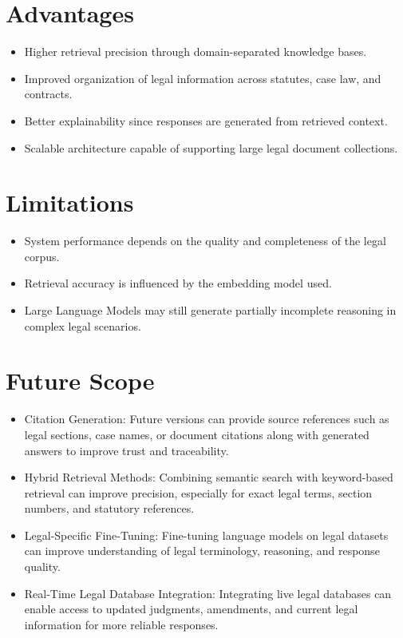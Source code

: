 \documentclass[12pt,a4paper]{article}
\begin{document}
\section{Advantages}

\begin{itemize}
\item Higher retrieval precision through domain-separated knowledge bases.
\item Improved organization of legal information across statutes, case law, and contracts.
\item Better explainability since responses are generated from retrieved context.
\item Scalable architecture capable of supporting large legal document collections.
\end{itemize}

\section{Limitations}

\begin{itemize}
\item System performance depends on the quality and completeness of the legal corpus.
\item Retrieval accuracy is influenced by the embedding model used.
\item Large Language Models may still generate partially incomplete reasoning in complex legal scenarios.
\end{itemize}

\section{Future Scope}

\begin{itemize}
\item Citation Generation: Future versions can provide source references such as legal sections, case names, or document citations along with generated answers to improve trust and traceability.
\item Hybrid Retrieval Methods: Combining semantic search with keyword-based retrieval can improve precision, especially for exact legal terms, section numbers, and statutory references.
\item Legal-Specific Fine-Tuning: Fine-tuning language models on legal datasets can improve understanding of legal terminology, reasoning, and response quality.
\item Real-Time Legal Database Integration: Integrating live legal databases can enable access to updated judgments, amendments, and current legal information for more reliable responses.
\end{itemize}
\end{document}
